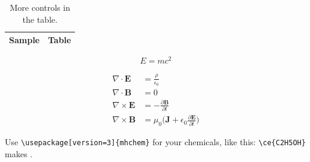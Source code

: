 \documentclass[draft,12pt]{emory}
\begin{document}
\begin{table}[htp!]
  \centering
  \caption{More controls in the table.}
  \begin{tabular}{l l}
    \hline
    Sample & Table \\
    \hline
  \end{tabular}
\end{table}

\begin{equation}
  E = mc^2
\end{equation}

\begin{subequations}
\begin{align}
  \nabla\cdot\pmb{E}&=\frac{\rho}{\epsilon_0}\\
  \nabla\cdot\pmb{B}&=0\\
  \nabla\times\pmb{E}&=-\frac{\partial\pmb{B}}{\partial t}\\
  \nabla\times\pmb{B}&=\mu_0\Big(\pmb{J}+\epsilon_0\frac{\partial\pmb{E}}{\partial t}\Big)
\end{align}
\end{subequations}

Use \verb|\usepackage[version=3]{mhchem}| for your chemicals, like this:
\verb|\ce{C2H5OH}| makes .



\end{document}
